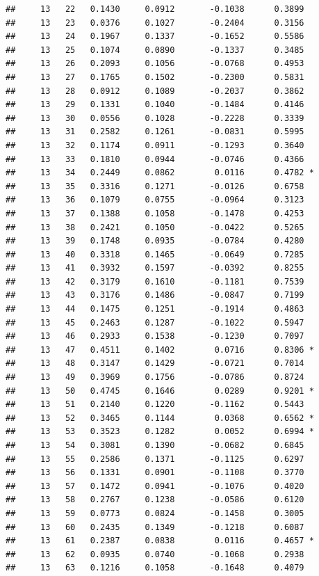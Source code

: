 \documentclass[
]{article}
\begin{document}
\begin{verbatim}
##     13   22   0.1430     0.0912       -0.1038      0.3899  
##     13   23   0.0376     0.1027       -0.2404      0.3156  
##     13   24   0.1967     0.1337       -0.1652      0.5586  
##     13   25   0.1074     0.0890       -0.1337      0.3485  
##     13   26   0.2093     0.1056       -0.0768      0.4953  
##     13   27   0.1765     0.1502       -0.2300      0.5831  
##     13   28   0.0912     0.1089       -0.2037      0.3862  
##     13   29   0.1331     0.1040       -0.1484      0.4146  
##     13   30   0.0556     0.1028       -0.2228      0.3339  
##     13   31   0.2582     0.1261       -0.0831      0.5995  
##     13   32   0.1174     0.0911       -0.1293      0.3640  
##     13   33   0.1810     0.0944       -0.0746      0.4366  
##     13   34   0.2449     0.0862        0.0116      0.4782 *
##     13   35   0.3316     0.1271       -0.0126      0.6758  
##     13   36   0.1079     0.0755       -0.0964      0.3123  
##     13   37   0.1388     0.1058       -0.1478      0.4253  
##     13   38   0.2421     0.1050       -0.0422      0.5265  
##     13   39   0.1748     0.0935       -0.0784      0.4280  
##     13   40   0.3318     0.1465       -0.0649      0.7285  
##     13   41   0.3932     0.1597       -0.0392      0.8255  
##     13   42   0.3179     0.1610       -0.1181      0.7539  
##     13   43   0.3176     0.1486       -0.0847      0.7199  
##     13   44   0.1475     0.1251       -0.1914      0.4863  
##     13   45   0.2463     0.1287       -0.1022      0.5947  
##     13   46   0.2933     0.1538       -0.1230      0.7097  
##     13   47   0.4511     0.1402        0.0716      0.8306 *
##     13   48   0.3147     0.1429       -0.0721      0.7014  
##     13   49   0.3969     0.1756       -0.0786      0.8724  
##     13   50   0.4745     0.1646        0.0289      0.9201 *
##     13   51   0.2140     0.1220       -0.1162      0.5443  
##     13   52   0.3465     0.1144        0.0368      0.6562 *
##     13   53   0.3523     0.1282        0.0052      0.6994 *
##     13   54   0.3081     0.1390       -0.0682      0.6845  
##     13   55   0.2586     0.1371       -0.1125      0.6297  
##     13   56   0.1331     0.0901       -0.1108      0.3770  
##     13   57   0.1472     0.0941       -0.1076      0.4020  
##     13   58   0.2767     0.1238       -0.0586      0.6120  
##     13   59   0.0773     0.0824       -0.1458      0.3005  
##     13   60   0.2435     0.1349       -0.1218      0.6087  
##     13   61   0.2387     0.0838        0.0116      0.4657 *
##     13   62   0.0935     0.0740       -0.1068      0.2938  
##     13   63   0.1216     0.1058       -0.1648      0.4079  

\end{verbatim}
\end{document}
